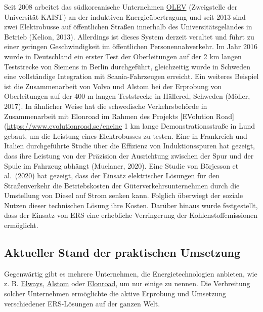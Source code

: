 \documentclass[
]{book}
\begin{document}
Seit 2008 arbeitet das südkoreanische Unternehmen \href{https://www.kaist.ac.kr/en/html/kaist/01200103.html}{OLEV} (Zweigstelle der Universität KAIST) an der induktiven Energieübertragung und seit 2013 sind zwei Elektrobusse auf öffentlichen Straßen innerhalb des Universitätsgeländes in Betrieb (Kelion, 2013). Allerdings ist dieses System derzeit veraltet und führt zu einer geringen Geschwindigkeit im öffentlichen Personennahverkehr. Im Jahr 2016 wurde in Deutschland ein erster Test der Oberleitungen auf der 2 km langen Teststrecke von Siemens in Berlin durchgeführt, gleichzeitig wurde in Schweden eine vollständige Integration mit Scania-Fahrzeugen erreicht. Ein weiteres Beispiel ist die Zusammenarbeit von Volvo und Alstom bei der Erprobung von Oberleitungen auf der 400 m langen Teststrecke in Hällered, Schweden (Möller, 2017). In ähnlicher Weise hat die schwedische Verkehrsbehörde in Zusammenarbeit mit Elonroad im Rahmen des Projekts {[}EVolution Road{]}(\url{https://www.evolutionroad.se/eneine} 1 km lange Demonstrationsstraße in Lund gebaut, um die Leistung eines Elektrobusses zu testen.
Eine in Frankreich und Italien durchgeführte Studie über die Effizienz von Induktionsspuren hat gezeigt, dass ihre Leistung von der Präzision der Ausrichtung zwischen der Spur und der Spule im Fahrzeug abhängt (Muelaner, 2020). Eine Studie von Börjesson et al.~(2020) hat gezeigt, dass der Einsatz elektrischer Lösungen für den Straßenverkehr die Betriebskosten der Güterverkehrsunternehmen durch die Umstellung von Diesel auf Strom senken kann. Folglich überwiegt der soziale Nutzen dieser technischen Lösung ihre Kosten. Darüber hinaus wurde festgestellt, dass der Einsatz von ERS eine erhebliche Verringerung der Kohlenstoffemissionen ermöglicht.

\hypertarget{aktueller-stand-der-praktischen-umsetzung-3}{%
\subsection*{Aktueller Stand der praktischen Umsetzung}\label{aktueller-stand-der-praktischen-umsetzung-3}}

Gegenwärtig gibt es mehrere Unternehmen, die Energietechnologien anbieten, wie z. B. \href{https://elways.se/}{Elways}, \href{https://www.alstom.com/}{Alstom} oder \href{https://elonroad.com/}{Elonroad}, um nur einige zu nennen. Die Verbreitung solcher Unternehmen ermöglichte die aktive Erprobung und Umsetzung verschiedener ERS-Lösungen auf der ganzen Welt.
\end{document}
